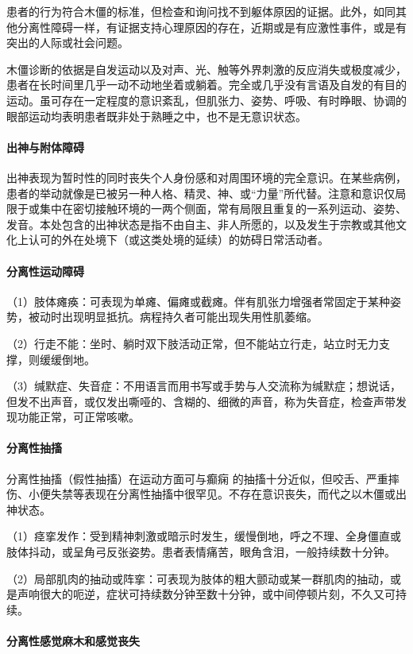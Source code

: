 患者的行为符合木僵的标准，但检查和询问找不到躯体原因的证据。此外，如同其他分离性障碍一样，有证据支持心理原因的存在，近期或是有应激性事件，或是有突出的人际或社会问题。

木僵诊断的依据是自发运动以及对声、光、触等外界刺激的反应消失或极度减少，患者在长时间里几乎一动不动地坐着或躺着。完全或几乎没有言语及自发的有目的运动。虽可存在一定程度的意识紊乱，但肌张力、姿势、呼吸、有时睁眼、协调的眼部运动均表明患者既非处于熟睡之中，也不是无意识状态。
\paragraph{出神与附体障碍}

出神表现为暂时性的同时丧失个人身份感和对周围环境的完全意识。在某些病例，患者的举动就像是已被另一种人格、精灵、神、或“力量”所代替。注意和意识仅局限于或集中在密切接触环境的一两个侧面，常有局限且重复的一系列运动、姿势、发音。本处包含的出神状态是指不由自主、非人所愿的，以及发生于宗教或其他文化上认可的外在处境下（或这类处境的延续）的妨碍日常活动者。
\paragraph{分离性运动障碍}

（1）肢体瘫痪：可表现为单瘫、偏瘫或截瘫。伴有肌张力增强者常固定于某种姿势，被动时出现明显抵抗。病程持久者可能出现失用性肌萎缩。

（2）行走不能：坐时、躺时双下肢活动正常，但不能站立行走，站立时无力支撑，则缓缓倒地。

（3）缄默症、失音症：不用语言而用书写或手势与人交流称为缄默症；想说话，但发不出声音，或仅发出嘶哑的、含糊的、细微的声音，称为失音症，检查声带发现功能正常，可正常咳嗽。
\paragraph{分离性抽搐}

分离性抽搐（假性抽搐）在运动方面可与癫痫
的抽搐十分近似，但咬舌、严重摔伤、小便失禁等表现在分离性抽搐中很罕见。不存在意识丧失，而代之以木僵或出神状态。

（1）痉挛发作：受到精神刺激或暗示时发生，缓慢倒地，呼之不理、全身僵直或肢体抖动，或呈角弓反张姿势。患者表情痛苦，眼角含泪，一般持续数十分钟。

（2）局部肌肉的抽动或阵挛：可表现为肢体的粗大颤动或某一群肌肉的抽动，或是声响很大的呃逆，症状可持续数分钟至数十分钟，或中间停顿片刻，不久又可持续。
\paragraph{分离性感觉麻木和感觉丧失}

